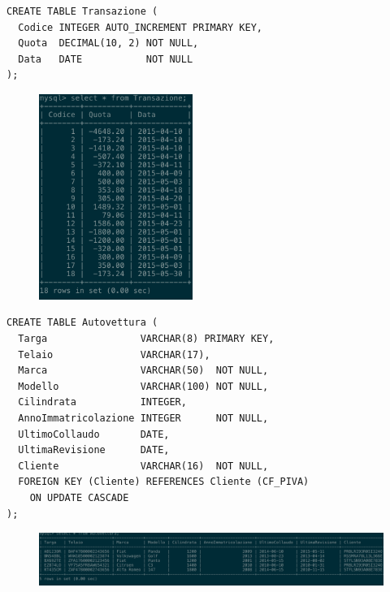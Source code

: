     \begin{lstlisting}
CREATE TABLE Transazione (
  Codice INTEGER AUTO_INCREMENT PRIMARY KEY,
  Quota  DECIMAL(10, 2) NOT NULL,
  Data   DATE           NOT NULL
);
    \end{lstlisting}
    \begin{figure}[H]
      \centering
      \includegraphics[width=5cm]{images/screenshots/schema/transazione.png}
    \end{figure}

    \begin{lstlisting}
CREATE TABLE Autovettura (
  Targa                VARCHAR(8) PRIMARY KEY,
  Telaio               VARCHAR(17),
  Marca                VARCHAR(50)  NOT NULL,
  Modello              VARCHAR(100) NOT NULL,
  Cilindrata           INTEGER,
  AnnoImmatricolazione INTEGER      NOT NULL,
  UltimoCollaudo       DATE,
  UltimaRevisione      DATE,
  Cliente              VARCHAR(16)  NOT NULL,
  FOREIGN KEY (Cliente) REFERENCES Cliente (CF_PIVA)
    ON UPDATE CASCADE
);
    \end{lstlisting}
    \begin{figure}[H]
      \centering
      \includegraphics[width=14cm]{images/screenshots/schema/autovettura.png}
    \end{figure}

